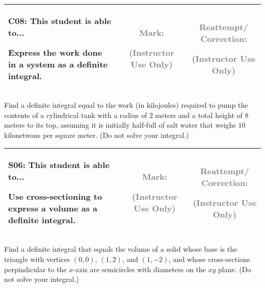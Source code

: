 \documentclass[12pt]{article}
\newcommand{\standardQuestion}[2]{
\newpage
\begin{center}
  \begin{tabular}{|l|c|c|}
  \hline
    \parbox{4in}{
      \textbf{#1}: This student is able to...\\
      #2
    }
  &
    \parbox{1in}{
      \vspace{0.1in}
      \footnotesize \textcolor{gray}{Mark:}
      \vspace{0.7in}

      \tiny \textcolor{gray}{(Instructor Use Only)}
    }
  &
    \parbox{1in}{
      \vspace{0.1in}
      \footnotesize \textcolor{gray}{Reattempt/ Correction:}
      \vspace{0.53in}

      \tiny \textcolor{gray}{(Instructor Use Only)}
    }
  \\\hline
  \end{tabular}
\end{center}
}
\begin{document}
\standardQuestion{C08}{
  Express the work done in a system as a definite integral.
}

Find a definite integral equal to the work (in kilojoules) required to
pump the contents of a cylindrical tank with a radius of \(2\)
meters and a total height of \(8\) meters to its top, assuming it is initially
half-full of salt water that weighs \(10\) kilonetwons per square meter.
(Do not solve your integral.)





%
%
%
%
%
%
%
%
%
%
%



%
%
%
%
%
%
%
%
%
%
%
%
%
%
%
%




\standardQuestion{S06}{
  Use cross-sectioning to express a volume as a definite integral.
}

Find a definite integral that equals the volume of a solid whose base
is the triangle with vertices \((0,0)\), \((1,2)\), and \((1,-2)\),
and whose cross-sections perpindicular to the \(x\)-axis are semicircles
with diameters on the \(xy\) plane. (Do not solve your integral.)
\end{document}
